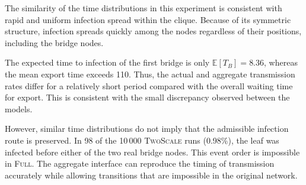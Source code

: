 \documentclass[a4paper,fleqn]{cas-sc}
\newcommand{\Full}{\textup{\textsc{Full}}}
\newcommand{\TS}{\textup{\textsc{TwoScale}}}
\begin{document}
The similarity of the time distributions in this experiment is consistent with rapid and uniform infection spread within the clique. Because of its symmetric structure, infection spreads quickly among the nodes regardless of their positions, including the bridge nodes.

The expected time to infection of the first bridge is only $\mathbb{E}[T_B]=8.36$, whereas the mean export time exceeds 110. Thus, the actual and aggregate transmission rates differ for a relatively short period compared with the overall waiting time for export. This is consistent with the small discrepancy observed between the models.

However, similar time distributions do not imply that the admissible infection route is preserved. In 98 of the 10\,000 \TS{} runs (0.98\%), the leaf was infected before either of the two real bridge nodes. This event order is impossible in \Full{}. The aggregate interface can reproduce the timing of transmission accurately while allowing transitions that are impossible in the original network.
\end{document}
